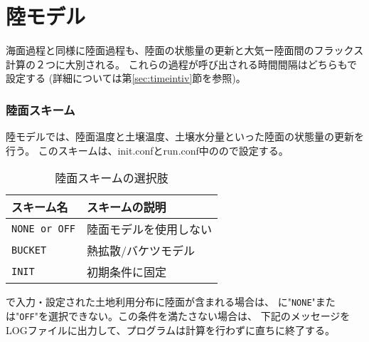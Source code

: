 \section{陸モデル} \label{sec:basic_usel_land}
海面過程と同様に陸面過程も、陸面の状態量の更新と大気ー陸面間のフラックス計算の２つに大別される。
これらの過程が呼び出される時間間隔はどちらもで設定する
(詳細については第\ref{sec:timeintiv}節を参照)。

\subsubsection{陸面スキーム}
陸モデルでは、陸面温度と土壌温度、土壌水分量といった陸面の状態量の更新を行う。
このスキームは、init.confとrun.conf中のので設定する。
%

\begin{table}[hbt]
\begin{center}
  \caption{陸面スキームの選択肢}
  \label{tab:nml_land_dyn}
  \begin{tabularx}{150mm}{lX} \hline
    \rowcolor[gray]{0.9}  スキーム名 & スキームの説明 \\ \hline
      \verb|NONE or OFF| & 陸面モデルを使用しない \\
      \verb|BUCKET|      & 熱拡散/バケツモデル \\
      \verb|INIT|        & 初期条件に固定 \\
    \hline
  \end{tabularx}
\end{center}
\end{table}


で入力・設定された土地利用分布に陸面が含まれる場合は、
に"\verb|NONE|"または"\verb|OFF|"を選択できない。この条件を満たさない場合は、
下記のメッセージをLOGファイルに出力して、プログラムは計算を行わずに直ちに終了する。

